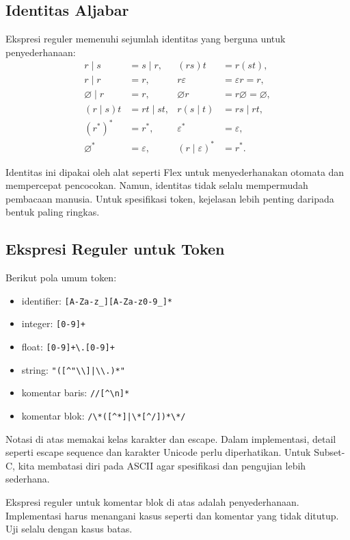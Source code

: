 \subsection{Identitas Aljabar}

Ekspresi reguler memenuhi sejumlah identitas yang berguna untuk
penyederhanaan:
\[
\begin{aligned}
r \mid s &= s \mid r, &
(rs)t &= r(st),\\
r \mid r &= r, &
r\varepsilon &= \varepsilon r = r,\\
\varnothing \mid r &= r, &
\varnothing r &= r\varnothing = \varnothing,\\
(r \mid s)t &= rt \mid st, &
r(s \mid t) &= rs \mid rt,\\
(r^{*})^{*} &= r^{*}, &
\varepsilon^{*} &= \varepsilon,\\
\varnothing^{*} &= \varepsilon, &
(r \mid \varepsilon)^{*} &= r^{*}.
\end{aligned}
\]

Identitas ini dipakai oleh alat seperti Flex untuk menyederhanakan
otomata dan mempercepat pencocokan. Namun, identitas tidak selalu
mempermudah pembacaan manusia. Untuk spesifikasi token, kejelasan
lebih penting daripada bentuk paling ringkas.

\subsection{Ekspresi Reguler untuk Token}

Berikut pola umum token:
\begin{itemize}[leftmargin=*]
  \item identifier: \verb![A-Za-z_][A-Za-z0-9_]*!
  \item integer: \verb![0-9]+!
  \item float: \verb![0-9]+\.[0-9]+!
  \item string: \verb!"([^"\\]|\\.)*"!
  \item komentar baris: \verb!//[^\n]*!
  \item komentar blok: \verb!/\*([^*]|\*[^/])*\*/!
\end{itemize}

Notasi di atas memakai kelas karakter dan escape. Dalam implementasi,
detail seperti escape sequence dan karakter Unicode perlu
diperhatikan. Untuk Subset-C, kita membatasi diri pada ASCII agar
spesifikasi dan pengujian lebih sederhana.

\begin{warningbox}
Ekspresi reguler untuk komentar blok di atas adalah penyederhanaan.
Implementasi harus menangani kasus seperti \code{/**/} dan
komentar yang tidak ditutup. Uji selalu dengan kasus batas.
\end{warningbox}
